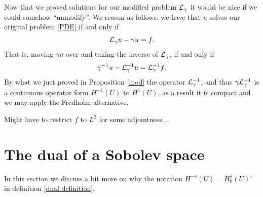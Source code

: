 \documentclass[12pt]{article}
\theoremstyle{definition}
\newcommand{\red}[1]{{\color{red}#1}}
\begin{document}
Now that we proved solutions for our modified problem $\mathcal{L}_\gamma $ it would be nice if we could somehow ``unmodify''. We reason as follows: we have that $u$ solves our original problem  \eqref{PDE} if and only if
\begin{align*}
	\mathcal{L}_\gamma u - \gamma  u =f.
\end{align*}
That is, moving $\gamma  u$ over and taking the inverse of $\mathcal{L}_\gamma $, if and only if
\begin{align*}
	\gamma^{-1}u -\mathcal{L}_\gamma ^{-1} u = \mathcal{L}_\gamma ^{-1}f.
\end{align*}
By what we just proved in Proposition \ref{mod} the operator $\mathcal{L}_\gamma^{-1}$, and thus $ \gamma \mathcal{L}_\gamma ^{-1}$ is a continuous operator form $H^{-1}(U)$ to  $H^{1}(U)$, as a result it is compact and we may apply the Fredholm alternative.

\red{Might have to restrict $f$ to  $L^2$ for some adjointness....}

\appendix
\section{The dual of a Sobolev space}\label{dual section}
In this section we discuss a bit more on why the notation $H^{-s}(U)=H_0^s(U)'$ in definition \ref{dual definition}.
\end{document}
